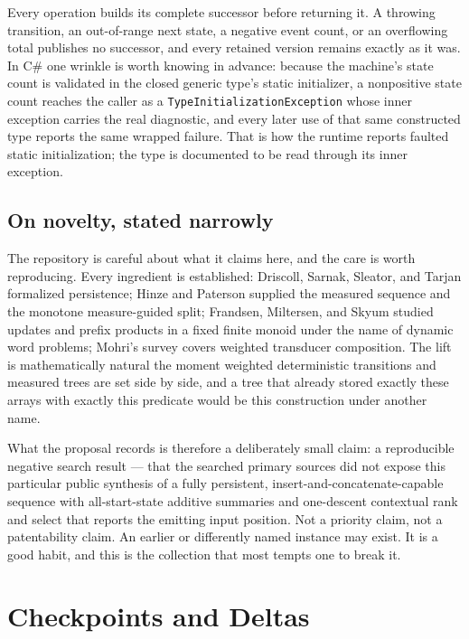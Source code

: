 \documentclass[11pt,twoside,openright]{book}
\newcommand{\code}[1]{\texorpdfstring{\textcolor{d7ink}{\texttt{#1}}}{#1}}
\begin{document}
\begin{contractbox}
Every operation builds its complete successor before returning it. A throwing
transition, an out-of-range next state, a negative event count, or an overflowing
total publishes no successor, and every retained version remains exactly as it
was. In C\# one wrinkle is worth knowing in advance: because the machine's state
count is validated in the closed generic type's static initializer, a nonpositive
state count reaches the caller as a \code{TypeInitializationException} whose inner
exception carries the real diagnostic, and every later use of that same
constructed type reports the same wrapped failure. That is how the runtime
reports faulted static initialization; the type is documented to be read through
its inner exception.
\end{contractbox}

\section{On novelty, stated narrowly}

The repository is careful about what it claims here, and the care is worth
reproducing. Every ingredient is established: Driscoll, Sarnak, Sleator, and
Tarjan formalized persistence; Hinze and Paterson supplied the measured sequence
and the monotone measure-guided split; Frandsen, Miltersen, and Skyum studied
updates and prefix products in a fixed finite monoid under the name of dynamic
word problems; Mohri's survey covers weighted transducer composition. The lift is
mathematically natural the moment weighted deterministic transitions and measured
trees are set side by side, and a tree that already stored exactly these arrays
with exactly this predicate would be this construction under another name.

What the proposal records is therefore a deliberately small claim: a reproducible
negative search result --- that the searched primary sources did not expose this
particular public synthesis of a fully persistent, insert-and-concatenate-capable
sequence with all-start-state additive summaries and one-descent contextual
rank and select that reports the emitting input position. Not a priority claim,
not a patentability claim. An earlier or differently named instance may exist. It
is a good habit, and this is the collection that most tempts one to break it.


\chapter{Checkpoints and Deltas}
\label{ch:checkpoint}
\end{document}
